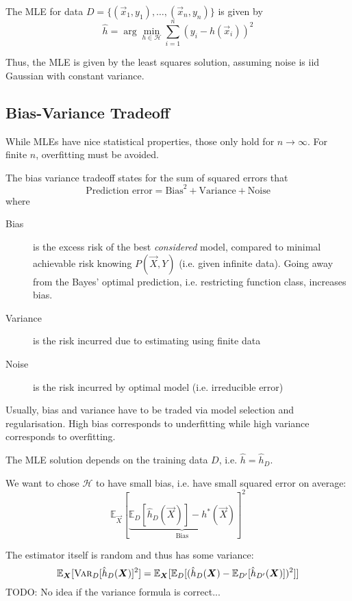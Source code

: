 The MLE for data $D = \{(\vec{x}_1, y_1), \dotsc, (\vec{x}_n, y_n)\}$
is given by
\begin{equation*}
    \hat{h} = \arg\min_{h \in \mathcal{H}}{
        \sum_{i=1}^n{(y_i - h(\vec{x}_i))^2}
    }
\end{equation*}

Thus, the MLE is given by the least squares
solution, assuming noise is iid Gaussian
with constant variance.


\subsection{Bias-Variance Tradeoff}
While MLEs have nice statistical properties,
those only hold for $n \to \infty$.
For finite $n$, overfitting must be avoided.

The bias variance tradeoff states
for the sum of squared errors that
\begin{equation*}
    \text{Prediction error} = \text{Bias}^2 + \text{Variance} + \text{Noise}
\end{equation*}
where
\begin{description}
    \item[Bias] is the excess risk of the best
    \emph{considered} model,
    compared to minimal achievable risk
    knowing $P(\vec{X}, Y)$
    (i.e. given infinite data).
    Going away from the Bayes' optimal
    prediction, i.e. restricting function
    class, increases bias.
    \item[Variance] is the risk incurred
    due to estimating using finite data
    \item[Noise] is the risk incurred by
    optimal model (i.e. irreducible error)
\end{description}

Usually, bias and variance have to be traded
via model selection and regularisation.
High bias corresponds to underfitting
while high variance corresponds to overfitting.

The MLE solution depends on the training data $D$,
i.e. $\hat{h} = \hat{h}_D$.

We want to chose $\mathcal{H}$ to have small bias,
i.e. have small squared error on average:
\begin{equation*}
    \mathbb{E}_{\vec{X}}[
        \underbrace{\mathbb{E}_D[\hat{h}_D(\vec{X})] - h^*(\vec{X})}_{\text{Bias}}
    ]^2
\end{equation*}

The estimator itself is random and
thus has some variance:
\begin{equation*}
    \mathbb{E}_{\boldsymbol{X}}[\textsc{Var}_D[\hat{h}_D(\boldsymbol{X})]^2]
    = \mathbb{E}_{\boldsymbol{X}}[
        \mathbb{E}_D[(
            \hat{h}_D(\boldsymbol{X}) - \mathbb{E}_{D'}[\hat{h}_{D'}(\boldsymbol{X})]
        )^2]
    ]
\end{equation*}
TODO: No idea if the variance formula is correct...

